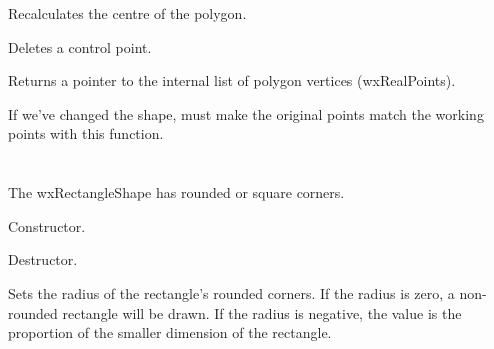 

Recalculates the centre of the polygon.



Deletes a control point.



Returns a pointer to the internal list of polygon vertices (wxRealPoints).



If we've changed the shape, must make the original
points match the working points with this function.

\section{}\label{wxrectangleshape}

The wxRectangleShape has rounded or square corners.






Constructor.



Destructor.



Sets the radius of the rectangle's rounded corners. If the radius is zero, a non-rounded
rectangle will be drawn. If the radius is negative, the value is the proportion of the
smaller dimension of the rectangle.

